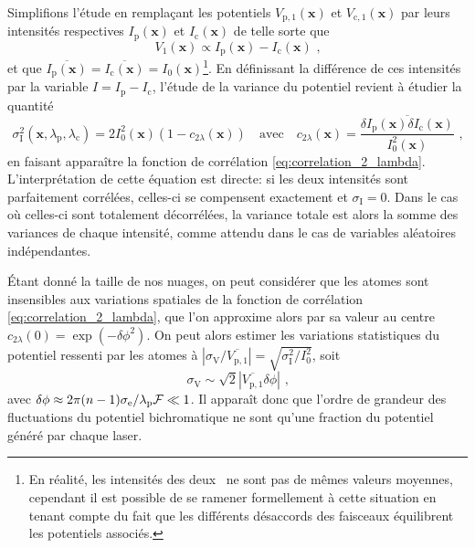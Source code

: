 Simplifions l'étude en remplaçant les potentiels $V_{\mathrm{p,1}}(\mathbf{x})$ et $V_{\mathrm{c,1}}(\mathbf{x})$ par leurs intensités respectives $I_{\mathrm{p}}(\mathbf{x})$ et $I_{\mathrm{c}}(\mathbf{x})$ de telle sorte que
\begin{equation}
V_1(\mathbf{x})\propto I_{\mathrm{p}}(\mathbf{x}) - I_{\mathrm{c}}(\mathbf{x}) \text{ ,}
\end{equation}
et que $\overline{I_{\mathrm{p}}(\mathbf{x})}=\overline{I_{\mathrm{c}}(\mathbf{x})}=I_0(\mathbf{x})$\footnote{En réalité, les intensités des deux \speckles\ ne sont pas de mêmes valeurs moyennes, cependant il est possible de se ramener formellement à cette situation en tenant compte du fait que les différents désaccords des faisceaux équilibrent les potentiels associés.}. En définissant la différence de ces intensités par la variable $I=I_{\mathrm{p}}-I_{\mathrm{c}}$, l'étude de la variance du potentiel revient à étudier la quantité
\begin{equation}
\sigma_{\mathrm{I}}^2(\mathbf{x},\lambda_{\mathrm{p}},\lambda_{\mathrm{c}})=2 I_0^2(\mathbf{x}) \left(1- c_{\mathrm{2}\lambda}(\mathbf{x}) \right) \quad \text{avec} \quad c_{\mathrm{2}\lambda}(\mathbf{x})=\frac{\overline{\delta I_{\mathrm{p}}(\mathbf{x})\delta I_{\mathrm{c}}(\mathbf{x})}}{I_0^2(\mathbf{x})} \text{ ,}
\end{equation}
en faisant apparaître la fonction de corrélation \ref{eq:correlation_2_lambda}. L'interprétation de cette équation est directe: si les deux intensités sont parfaitement corrélées, celles-ci se compensent exactement et $\sigma_{\mathrm{I}}=0$. Dans le cas où celles-ci sont totalement décorrélées, la variance totale est alors la somme des variances de chaque intensité, comme attendu dans le cas de variables aléatoires indépendantes.




Étant donné la taille de nos nuages, on peut considérer que les atomes sont insensibles aux variations spatiales de la fonction de corrélation \ref{eq:correlation_2_lambda}, que l'on approxime alors par sa valeur au centre $c_{\mathrm{2}\lambda}(0)=\exp{(-\delta\phi^2)}$. On peut alors estimer les variations statistiques du potentiel ressenti par les atomes à $\left|\sigma_{\mathrm{V}}/\overline{V_{\mathrm{p,1}}}\right|=\sqrt{\sigma_{\mathrm{I}}^2/I_0^2}$, soit
\begin{equation}
\sigma_{\mathrm{V}}\sim \sqrt{2} \left|\overline{V_{\mathrm{p,1}}} \delta\phi \right| \text{ ,}
\end{equation}
avec $\delta\phi\approx 2\pi (n-1) \sigma_{\mathrm{e}}/\lambda_{\mathrm{p}} \mathcal{F} \ll 1$. Il apparaît donc que l'ordre de grandeur des fluctuations du potentiel bichromatique ne sont qu'une fraction du potentiel généré par chaque laser.


